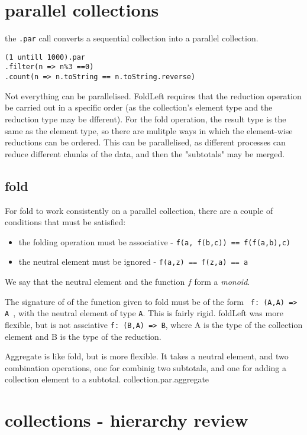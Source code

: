 \section{parallel collections}

the \lstinline|.par| call converts a sequential collection into a parallel collection.
\begin{lstlisting}
(1 untill 1000).par
.filter(n => n%3 ==0)
.count(n => n.toString == n.toString.reverse)
\end{lstlisting}

Not everything can be parallelised. FoldLeft requires that the reduction operation be carried out in a specific order (as the collection's element type and the reduction type may be dfferent). For the fold operation, the result type is the same as the element type, so there are mulitple ways in which the element-wise reductions can be ordered. This can be parallelised, as different processes can reduce different chunks of the data, and then the "subtotals" may be merged.


\subsection{fold}
For fold to work consistently on a parallel collection, there are a couple of conditions that must be satisfied:
\begin{itemize}
    \item the folding operation must be associative - \lstinline|f(a, f(b,c)) == f(f(a,b),c)|
    \item the neutral element must be ignored - \lstinline|f(a,z) == f(z,a) == a|
\end{itemize}
We say that the neutral element and the function $f$ form a { \em monoid}.

The signature of of the function given to fold must be of the form \lstinline| f: (A,A) => A |, with the neutral element of type \lstinline|A|. This is fairly rigid. foldLeft was more flexible, but is not assciative \lstinline|f: (B,A) => B|, where A is the type of the collection element and B is the type of the reduction.

Aggregate is like fold, but is more flexible. It takes a neutral element, and two combination operations, one for combinig two subtotals, and one for adding a collection element to a subtotal.
collection.par.aggregate

\section{collections - hierarchy review}

